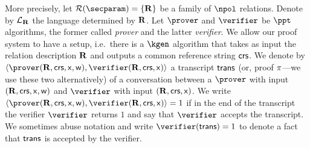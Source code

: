 \let\accentvec\vec \documentclass[runningheads]{llncs}
\begin{document}
More precisely, let $\RELGEN(\secparam) = \smallset{\REL}$ be a family of
$\npol$ relations. Denote by $\mathcal{L}_{\mathbf{R}}$ the language determined by $\mathbf{R}$. Let
$\prover$ and $\verifier$ be $\ppt$ algorithms, the former called \emph{prover}
and the latter \emph{verifier}. We allow our proof system to have a setup,
i.e.~there is a $\kgen$ algorithm that takes as input the relation description
$\mathbf{R}$ and outputs a common reference string $\mathsf{crs}$. We denote by
$\ip{\prover(\REL, \crs, \inp, \wit)}{\verifier(\REL, \crs,\inp)}$ a transcript
$\mathsf{trans}$ (or, proof $\pi$---we use these two alternatively) of a
conversation between a $\prover$ with input $(\mathbf{R}, \mathsf{crs}, \mathsf{x}, \mathsf{w})$ and
$\verifier$ with input $(\mathbf{R}, \mathsf{crs}, \mathsf{x})$. We write $\ip{\prover (\REL, \crs,
  \inp, \wit)}{\verifier(\REL, \crs, \inp)} = 1$ if in the end of the transcript
the verifier $\verifier$ returns $1$ and say that $\verifier$ accepts the
transcript. We sometimes abuse notation and write $\verifier(\trans) = 1$ to
denote a fact that $\mathsf{trans}$ is accepted by the verifier.
\end{document}
